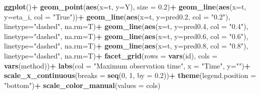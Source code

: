 \documentclass[
]{article}
\newenvironment{Shaded}{\begin{snugshade}}{\end{snugshade}}
\newcommand{\AttributeTok}[1]{\textcolor[rgb]{0.13,0.29,0.53}{#1}}
\newcommand{\DecValTok}[1]{\textcolor[rgb]{0.00,0.00,0.81}{#1}}
\newcommand{\FloatTok}[1]{\textcolor[rgb]{0.00,0.00,0.81}{#1}}
\newcommand{\FunctionTok}[1]{\textcolor[rgb]{0.13,0.29,0.53}{\textbf{#1}}}
\newcommand{\NormalTok}[1]{#1}
\newcommand{\SpecialCharTok}[1]{\textcolor[rgb]{0.81,0.36,0.00}{\textbf{#1}}}
\newcommand{\StringTok}[1]{\textcolor[rgb]{0.31,0.60,0.02}{#1}}
\begin{document}
\begin{Shaded}
\begin{Highlighting}[]
  \FunctionTok{ggplot}\NormalTok{()}\SpecialCharTok{+}
  \FunctionTok{geom\_point}\NormalTok{(}\FunctionTok{aes}\NormalTok{(}\AttributeTok{x=}\NormalTok{t, }\AttributeTok{y=}\NormalTok{Y), }\AttributeTok{size =} \FloatTok{0.2}\NormalTok{)}\SpecialCharTok{+}
  \FunctionTok{geom\_line}\NormalTok{(}\FunctionTok{aes}\NormalTok{(}\AttributeTok{x=}\NormalTok{t, }\AttributeTok{y=}\NormalTok{eta\_i, }\AttributeTok{col =} \StringTok{"True"}\NormalTok{))}\SpecialCharTok{+}
  \FunctionTok{geom\_line}\NormalTok{(}\FunctionTok{aes}\NormalTok{(}\AttributeTok{x=}\NormalTok{t, }\AttributeTok{y=}\NormalTok{pred0}\FloatTok{.2}\NormalTok{, }\AttributeTok{col =} \StringTok{"0.2"}\NormalTok{), }\AttributeTok{linetype=}\StringTok{"dashed"}\NormalTok{, }\AttributeTok{na.rm=}\NormalTok{T)}\SpecialCharTok{+}
  \FunctionTok{geom\_line}\NormalTok{(}\FunctionTok{aes}\NormalTok{(}\AttributeTok{x=}\NormalTok{t, }\AttributeTok{y=}\NormalTok{pred0}\FloatTok{.4}\NormalTok{, }\AttributeTok{col =} \StringTok{"0.4"}\NormalTok{), }\AttributeTok{linetype=}\StringTok{"dashed"}\NormalTok{, }\AttributeTok{na.rm=}\NormalTok{T)}\SpecialCharTok{+}
  \FunctionTok{geom\_line}\NormalTok{(}\FunctionTok{aes}\NormalTok{(}\AttributeTok{x=}\NormalTok{t, }\AttributeTok{y=}\NormalTok{pred0}\FloatTok{.6}\NormalTok{, }\AttributeTok{col =} \StringTok{"0.6"}\NormalTok{), }\AttributeTok{linetype=}\StringTok{"dashed"}\NormalTok{, }\AttributeTok{na.rm=}\NormalTok{T)}\SpecialCharTok{+}
  \FunctionTok{geom\_line}\NormalTok{(}\FunctionTok{aes}\NormalTok{(}\AttributeTok{x=}\NormalTok{t, }\AttributeTok{y=}\NormalTok{pred0}\FloatTok{.8}\NormalTok{, }\AttributeTok{col =} \StringTok{"0.8"}\NormalTok{), }\AttributeTok{linetype=}\StringTok{"dashed"}\NormalTok{, }\AttributeTok{na.rm=}\NormalTok{T)}\SpecialCharTok{+}
  \FunctionTok{facet\_grid}\NormalTok{(}\AttributeTok{rows =} \FunctionTok{vars}\NormalTok{(id), }\AttributeTok{cols =} \FunctionTok{vars}\NormalTok{(method))}\SpecialCharTok{+}
  \FunctionTok{labs}\NormalTok{(}\AttributeTok{col =} \StringTok{"Maximum observation time"}\NormalTok{, }\AttributeTok{x =} \StringTok{"Time"}\NormalTok{, }\AttributeTok{y=}\StringTok{""}\NormalTok{)}\SpecialCharTok{+}
  \FunctionTok{scale\_x\_continuous}\NormalTok{(}\AttributeTok{breaks =} \FunctionTok{seq}\NormalTok{(}\DecValTok{0}\NormalTok{, }\DecValTok{1}\NormalTok{, }\AttributeTok{by =} \FloatTok{0.2}\NormalTok{))}\SpecialCharTok{+}
  \FunctionTok{theme}\NormalTok{(}\AttributeTok{legend.position =} \StringTok{"bottom"}\NormalTok{)}\SpecialCharTok{+}
  \FunctionTok{scale\_color\_manual}\NormalTok{(}\AttributeTok{values =}\NormalTok{ cols)}
\end{Highlighting}
\end{Shaded}
\end{document}

